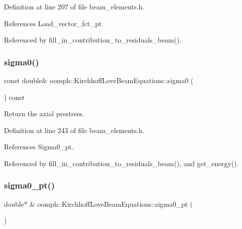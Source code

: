 Definition at line 207 of file beam\+\_\+elements.\+h.



References Load\+\_\+vector\+\_\+fct\+\_\+pt.



Referenced by fill\+\_\+in\+\_\+contribution\+\_\+to\+\_\+residuals\+\_\+beam().

\mbox{\label{classoomph_1_1KirchhoffLoveBeamEquations_aa6d1fce06b7f030673fa5dce0f539a72}} 
\subsubsection{\texorpdfstring{sigma0()}{sigma0()}}
{\footnotesize\ttfamily const double\& oomph\+::\+Kirchhoff\+Love\+Beam\+Equations\+::sigma0 (\begin{DoxyParamCaption}{ }\end{DoxyParamCaption}) const\hspace{0.3cm}{\ttfamily [inline]}}



Return the axial prestress. 



Definition at line 243 of file beam\+\_\+elements.\+h.



References Sigma0\+\_\+pt.



Referenced by fill\+\_\+in\+\_\+contribution\+\_\+to\+\_\+residuals\+\_\+beam(), and get\+\_\+energy().

\mbox{\label{classoomph_1_1KirchhoffLoveBeamEquations_a1aa02dcbcf7a8f278100aa509a1cf4ae}} 
\subsubsection{\texorpdfstring{sigma0\+\_\+pt()}{sigma0\_pt()}}
{\footnotesize\ttfamily double$\ast$ \& oomph\+::\+Kirchhoff\+Love\+Beam\+Equations\+::sigma0\+\_\+pt (\begin{DoxyParamCaption}{ }\end{DoxyParamCaption})\hspace{0.3cm}{\ttfamily [inline]}}



